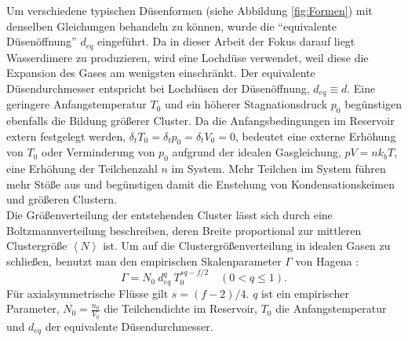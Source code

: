 Um verschiedene typischen Düsenformen (siehe Abbildung \ref{fig:Formen}) mit denselben Gleichungen behandeln zu können, wurde die \enquote{equivalente Düsenöffnung} $d_{eq}$ eingeführt. Da in dieser Arbeit der Fokus darauf liegt Wasserdimere zu produzieren, wird eine Lochdüse verwendet, weil diese die Expansion des Gases am wenigsten einschränkt. Der equivalente Düsendurchmesser entspricht bei Lochdüsen der Düsenöffnung, $d_{eq} \equiv d$.
%
Eine geringere Anfangstemperatur $T_0$ und ein höherer Stagnationsdruck $p_0$ begünstigen ebenfalls die Bildung größerer Cluster. Da die Anfangsbedingungen im Reservoir extern festgelegt werden, $\delta_t T_0 = \delta_t p_0 = \delta_t V_0 = 0$, bedeutet eine externe Erhöhung von $T_0$ oder Verminderung von $p_0$ aufgrund der idealen Gasgleichung, $pV = nk_bT$, eine Erhöhung der Teilchenzahl $n$ im System. Mehr Teilchen im System führen mehr Stöße aus und begünstigen damit die Enstehung von Kondensationskeimen und größeren Clustern. \\
%
Die Größenverteilung der entstehenden Cluster lässt sich durch eine Boltzmannverteilung beschreiben, deren Breite proportional zur mittleren Clustergröße $\left\langle N \right\rangle$ ist. Um auf die Clustergrößenverteilung in idealen Gasen zu schließen, benutzt man den empirischen Skalenparameter $\Gamma$ von Hagena \cite{hagena1987}:
%
\begin{equation} \label{eq:Skalenparameter}
\Gamma = N_0\ d_{eq}^q\ T_0^{sq - f/2} \quad (0 < q \leq 1).
\end{equation}
%
Für axialsymmetrische Flüsse gilt $s = (f-2)/4$. $q$ ist ein empirischer Parameter, $N_0 = \frac{n_0}{V_0}$ die Teilchendichte im Reservoir, $T_0$ die Anfangstemperatur und $d_{eq}$ der equivalente Düsendurchmesser. 
